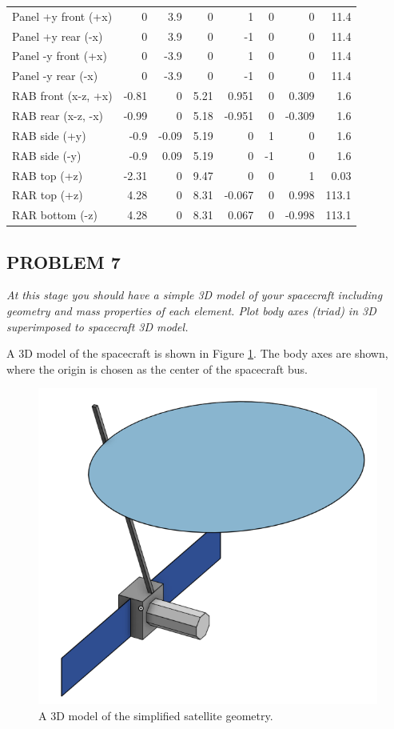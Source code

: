 \begin{longtable}{l|r|r|r|r|r|r|r}
Panel +y front (+x)            & 0     & 3.9   & 0     & 1      & 0      & 0      & 11.4  \\
Panel +y rear (-x)             & 0     & 3.9   & 0     & -1     & 0      & 0      & 11.4  \\
Panel -y front (+x)            & 0     & -3.9  & 0     & 1      & 0      & 0      & 11.4  \\
Panel -y rear (-x)             & 0     & -3.9  & 0     & -1     & 0      & 0      & 11.4  \\
RAB front (x-z, +x)            & -0.81 & 0     & 5.21  & 0.951  & 0      & 0.309  & 1.6   \\
RAB rear (x-z, -x)             & -0.99 & 0     & 5.18  & -0.951 & 0      & -0.309 & 1.6   \\
RAB side (+y)                  & -0.9  & -0.09 & 5.19  & 0      & 1      & 0      & 1.6   \\
RAB side (-y)                  & -0.9  & 0.09  & 5.19  & 0      & -1     & 0      & 1.6   \\
RAB top (+z)                   & -2.31 & 0     & 9.47  & 0      & 0      & 1      & 0.03  \\
RAR top (+z)                   & 4.28  & 0     & 8.31  & -0.067 & 0      & 0.998  & 113.1 \\
RAR bottom (-z)                & 4.28  & 0     & 8.31  & 0.067  & 0      & -0.998 & 113.1
\end{longtable}

\subsection{PROBLEM 7}
\textit{At this stage you should have a simple 3D model of your spacecraft including geometry and mass properties of each element. Plot body axes (triad) in 3D superimposed to spacecraft 3D model.}

A 3D model of the spacecraft is shown in Figure \ref{CAD model}. The body axes are shown, where the origin is chosen as the center of the spacecraft bus.

\begin{figure}[H]
\centering
\includegraphics[scale=0.7]{Images/CAD Model (Simplified).png}
\caption{A 3D model of the simplified satellite geometry.}
\label{CAD model}
\end{figure}